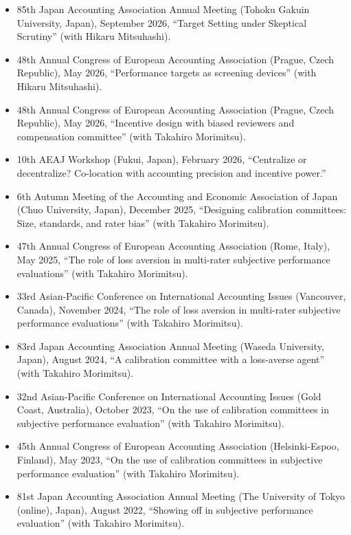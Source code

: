 \documentclass[letterpaper,11pt]{article}
\begin{document}
\begin{itemize}
    \item 85th Japan Accounting Association Annual Meeting (Tohoku Gakuin University, Japan), September 2026, ``Target Setting under Skeptical Scrutiny'' (with Hikaru Mitsuhashi).
    \item 48th Annual Congress of European Accounting Association (Prague, Czech Republic), May 2026, ``Performance targets as screening devices'' (with Hikaru Mitsuhashi).
    \item 48th Annual Congress of European Accounting Association (Prague, Czech Republic), May 2026, ``Incentive design with biased reviewers and compensation committee'' (with Takahiro Morimitsu).
    \item 10th AEAJ Workshop (Fukui, Japan), February 2026, ``Centralize or decentralize? Co-location with accounting precision and incentive power.''
    \item 6th Autumn Meeting of the Accounting and Economic Association of Japan (Chuo University, Japan), December 2025, ``Designing calibration committees: Size, standards, and rater bias'' (with Takahiro Morimitsu).
    \item 47th Annual Congress of European Accounting Association (Rome, Italy), May 2025, ``The role of loss aversion in multi-rater subjective performance evaluations'' (with Takahiro Morimitsu).
    \item 33rd Asian-Pacific Conference on International Accounting Issues (Vancouver, Canada), November 2024, ``The role of loss aversion in multi-rater subjective performance evaluations'' (with Takahiro Morimitsu).
    \item 83rd Japan Accounting Association Annual Meeting (Waseda University, Japan), August 2024, ``A calibration committee with a loss-averse agent'' (with Takahiro Morimitsu).
    \item 32nd Asian-Pacific Conference on International Accounting Issues (Gold Coast, Australia), October 2023, ``On the use of calibration committees in subjective performance evaluation'' (with Takahiro Morimitsu).
    \item 45th Annual Congress of European Accounting Association (Helsinki-Espoo, Finland), May 2023, ``On the use of calibration committees in subjective performance evaluation'' (with Takahiro Morimitsu).
    \item 81st Japan Accounting Association Annual Meeting (The University of Tokyo (online), Japan), August 2022, ``Showing off in subjective performance evaluation'' (with Takahiro Morimitsu).

\end{itemize}
\end{document}
